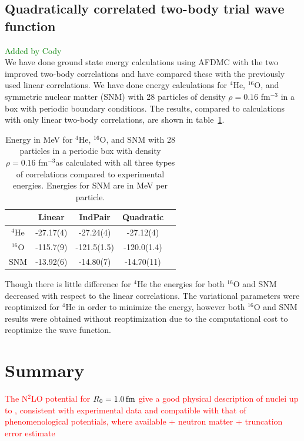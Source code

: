 \documentclass[aps,prc,twocolumn,superscriptaddress,floatfix]{revtex4-1}
\newcommand{\red}[1]{\protect\textcolor{red}{#1}}
\newcommand{\green}[1]{\protect\textcolor{green}{#1}}
\begin{document}
\subsection{Quadratically correlated two-body trial wave function}
\green{Added by Cody \\}
We have done ground state energy calculations using AFDMC with the two improved two-body correlations and have compared these with the previously used linear correlations. We have done energy calculations for $^4$He, $^{16}$O, and symmetric nuclear matter (SNM) with 28 particles of density $\rho=0.16$ fm$^{-3}$ in a box with periodic boundary conditions. The results, compared to calculations with only linear two-body correlations, are shown in table~\ref{tab:indpairresults}.
\begin{table}[h!]
   \centering
   \caption{Energy in MeV for $^4$He, $^{16}$O, and SNM with 28 particles in a periodic box with density $\rho=0.16$ fm$^{-3}$as calculated with all three types of correlations compared to experimental energies. Energies for SNM are in MeV per particle.}
   \label{tab:indpairresults}
   \begin{tabular}{ccccc}
      \hline \hline
       & Linear & IndPair & Quadratic \\
      \hline
      $^4$He & -27.17(4) & -27.24(4) & -27.12(4) \\
      $^{16}$O & -115.7(9) & -121.5(1.5) & -120.0(1.4) \\
      SNM & -13.92(6) & -14.80(7) & -14.70(11) \\
      \hline \hline
   \end{tabular}
\end{table}
Though there is little difference for $^4$He the energies for both $^{16}$O and SNM decreased with respect to the linear correlations. The variational parameters were reoptimized for $^4$He in order to minimize the energy, however both $^{16}$O and SNM results were obtained without reoptimization due to the computational cost to reoptimize the wave function.

\section{Summary}
\label{sec:summ}

\red{The N$^2$LO potential for $R_0=1.0\,\rm fm$ give a good physical description 
of nuclei up to \isotope[16]{O}, consistent with experimental data and compatible 
with that of phenomenological potentials, where available
+ neutron matter
+ truncation error estimate}
\end{document}
